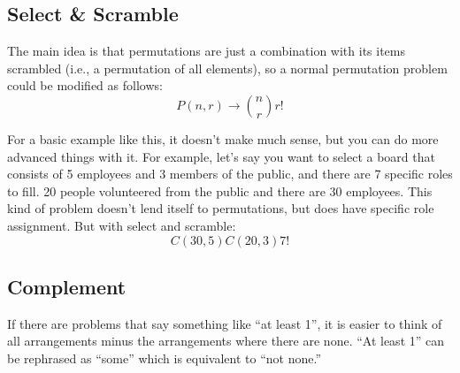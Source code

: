 \documentclass{article}
\begin{document}
    \subsection{Select \& Scramble}

    The main idea is that permutations are just a combination with its items scrambled (i.e., a permutation of all elements), so a normal permutation problem could be modified as follows: $$
        P(n, r) \to {n \choose r}r!
    $$

    For a basic example like this, it doesn't make much sense, but you can do more advanced things with it. For example, let's say you want to select a board that consists of 5 employees and 3 members of the public, and there are 7 specific roles to fill. 20 people volunteered from the public and there are 30 employees. This kind of problem doesn't lend itself to permutations, but does have specific role assignment. But with select and scramble: $$
        C(30, 5)C(20, 3)7!
    $$

    \subsection{Complement}

    If there are problems that say something like ``at least 1'', it is easier to think of all arrangements minus the arrangements where there are none. ``At least 1'' can be rephrased as ``some'' which is equivalent to ``not none.''
\end{document}
